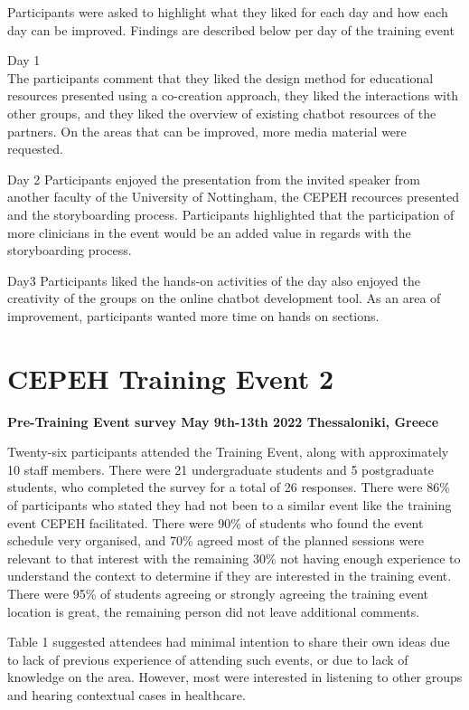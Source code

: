 \documentclass[a4paper, nobind]{templates/ociamthesis}
\begin{document}
Participants were asked to highlight what they liked for each day and how each day can be improved. Findings are described below per day of the training event

Day 1\\
The participants comment that they liked the design method for educational resources presented using a co-creation approach, they liked the interactions with other groups, and they liked the overview of existing chatbot resources of the partners. On the areas that can be improved, more media material were requested.

Day 2
Participants enjoyed the presentation from the invited speaker from another faculty of the University of Nottingham, the CEPEH recources presented and the storyboarding process. Participants highlighted that the participation of more clinicians in the event would be an added value in regards with the storyboarding process.

Day3
Participants liked the hands-on activities of the day also enjoyed the creativity of the groups on the online chatbot development tool. As an area of improvement, participants wanted more time on hands on sections.

\hypertarget{cepeh-training-event-2}{%
\section{CEPEH Training Event 2}\label{cepeh-training-event-2}}

\textbf{Pre-Training Event survey May 9th-13th 2022 Thessaloniki, Greece}

Twenty-six participants attended the Training Event, along with approximately 10 staff members. There were 21 undergraduate students and 5 postgraduate students, who completed the survey for a total of 26 responses. There were 86\% of participants who stated they had not been to a similar event like the training event CEPEH facilitated. There were 90\% of students who found the event schedule very organised, and 70\% agreed most of the planned sessions were relevant to that interest with the remaining 30\% not having enough experience to understand the context to determine if they are interested in the training event. There were 95\% of students agreeing or strongly agreeing the training event location is great, the remaining person did not leave additional comments.

Table 1 suggested attendees had minimal intention to share their own ideas due to lack of previous experience of attending such events, or due to lack of knowledge on the area. However, most were interested in listening to other groups and hearing contextual cases in healthcare.
\end{document}
